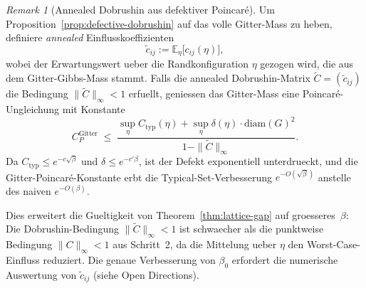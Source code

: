 \documentclass[12pt,a4paper]{article}
\theoremstyle{definition}
\theoremstyle{plain}
\theoremstyle{remark}
\newtheorem{remark}[definition]{Remark}
\begin{document}
\begin{remark}[Annealed Dobrushin aus defektiver Poincar\'e]\label{rem:annealed-dobrushin}
Um Proposition~\ref{prop:defective-dobrushin} auf das volle Gitter-Mass zu heben, definiere \emph{annealed} Einflusskoeffizienten
\begin{equation}\label{eq:annealed-influence}
  \tilde{c}_{ij} := \mathbb{E}_\eta\bigl[c_{ij}(\eta)\bigr],
\end{equation}
wobei der Erwartungswert ueber die Randkonfiguration $\eta$ gezogen wird, die aus dem Gitter-Gibbs-Mass stammt. Falls die annealed Dobrushin-Matrix $\tilde{C} = (\tilde{c}_{ij})$ die Bedingung $\|\tilde{C}\|_\infty < 1$ erfuellt, geniessen das Gitter-Mass eine Poincar\'e-Ungleichung mit Konstante
\begin{equation}\label{eq:annealed-poincare}
  C_P^{\mathrm{Gitter}} \;\leq\; \frac{\sup_\eta C_{\mathrm{typ}}(\eta) + \sup_\eta \delta(\eta) \cdot \mathrm{diam}(G)^2}{1 - \|\tilde{C}\|_\infty}.
\end{equation}
Da $C_{\mathrm{typ}} \leq e^{-c\sqrt{\beta}}$ und $\delta \leq e^{-c'\beta}$, ist der Defekt exponentiell unterdrueckt, und die Gitter-Poincar\'e-Konstante erbt die Typical-Set-Verbesserung $e^{-O(\sqrt{\beta})}$ anstelle des naiven $e^{-O(\beta)}$.

Dies erweitert die Gueltigkeit von Theorem~\ref{thm:lattice-gap} auf groesseres~$\beta$: Die Dobrushin-Bedingung $\|\tilde{C}\|_\infty < 1$ ist schwaecher als die punktweise Bedingung $\|C\|_\infty < 1$ aus Schritt~2, da die Mittelung ueber $\eta$ den Worst-Case-Einfluss reduziert. Die genaue Verbesserung von $\beta_0$ erfordert die numerische Auswertung von $\tilde{c}_{ij}$ (siehe Open Directions).
\end{remark}

\end{document}

